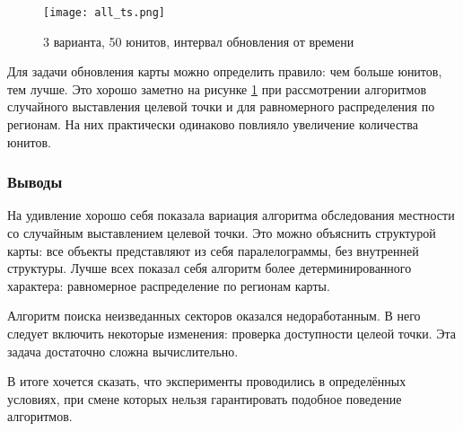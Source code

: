 \begin{figure}[h!]
    \centering
    \texttt{[image: all\_ts.png]}
    \caption{3 варианта, 50 юнитов, интервал обновления от времени}
    \label{fig:all_ts}
\end{figure}

Для задачи обновления карты можно определить правило: чем больше юнитов, тем
лучше. Это хорошо заметно на рисунке \ref{fig:all_ts} при рассмотрении
алгоритмов случайного выставления целевой точки и для равномерного распределения
по регионам. На них практически одинаково повлияло увеличение количества юнитов.

\clearpage

\subsubsection{Выводы}

На удивление хорошо себя показала вариация алгоритма обследования местности
со случайным выставлением целевой точки. Это можно объяснить структурой карты:
все объекты представляют из себя паралелограммы, без внутренней структуры.
Лучше всех показал себя алгоритм более детерминированного характера:
равномерное распределение по регионам карты.

Алгоритм поиска неизведанных секторов оказался недоработанным. В него следует
включить некоторые изменения: проверка доступности целеой точки. Эта задача
достаточно сложна вычислительно.

В итоге хочется сказать, что эксперименты проводились в определённых
условиях, при смене которых нельзя гарантировать подобное поведение
алгоритмов.

\clearpage
\newpage
